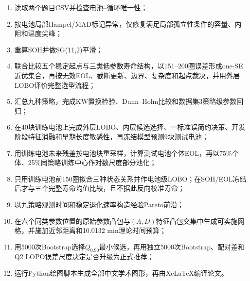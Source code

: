 \documentclass[withoutpreface]{cumcmthesis}
\begin{document}
\begin{enumerate}[label=\arabic*)]
  \item 读取两个题目CSV并检查电池--循环唯一性；
  \item 按电池局部Hampel/MAD标记异常，仅修复满足局部孤立性条件的容量、内阻和温度尖峰；
  \item 重算SOH并做SG(11,2)平滑；
  \item 联合比较五个稳定起点与三类低参数寿命结构，以151--200圈误差形成one-SE近优集合，再按无效EOL、截断更新、边界、复杂度和起点裁决，并用外层LOBO评价完整选型流程；
  \item 汇总九种策略，完成KW置换检验、Dunn--Holm比较和数据集3策略级参数回归；
  \item 在40块训练电池上完成外层LOBO、内层候选选择、一标准误简约决策、开发阶段特征消融和早期长度敏感性，再冻结模型预测9块测试电池；
  \item 用训练电池未来残差按电池块重采样，计算测试电池个体EOL，再以75\%个体、25\%同策略训练中心作对数尺度部分池化；
  \item 只用训练电池前150圈拟合三种状态关系并作电池级LOBO；在SOH/EOL冻结后才与三个完整寿命均值比较，且不据此反向校准寿命；
  \item 以九策略观测时间和稳定退化速率构造经验Pareto前沿；
  \item 在六个同类参数位置的原始参数凸包与$(A,D)$特征凸包交集中生成可实施网格，并施加近邻距离和10.0132 min理论时间预算；
  \item 用5000次Bootstrap选择$Q_{0.90}$最小候选，再用独立5000次Bootstrap、配对差和Q2 LOPO误差尺度决定是否升级为正式推荐；
  \item 运行Python绘图脚本生成全部中文学术图形，再由XeLaTeX编译论文。
\end{enumerate}
\end{document}
